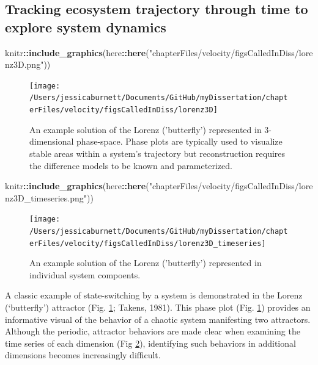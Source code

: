\documentclass[12pt,twoside,openany]{reedthesis}
\newenvironment{Shaded}{\begin{snugshade}}{\end{snugshade}}
\newcommand{\KeywordTok}[1]{\textcolor[rgb]{0.13,0.29,0.53}{\textbf{#1}}}
\newcommand{\NormalTok}[1]{#1}
\newcommand{\OperatorTok}[1]{\textcolor[rgb]{0.81,0.36,0.00}{\textbf{#1}}}
\newcommand{\StringTok}[1]{\textcolor[rgb]{0.31,0.60,0.02}{#1}}
\begin{document}
\hypertarget{tracking-ecosystem-trajectory-through-time-to-explore-system-dynamics}{%
\subsection{Tracking ecosystem trajectory through time to explore system dynamics}\label{tracking-ecosystem-trajectory-through-time-to-explore-system-dynamics}}
\begin{Shaded}
\begin{Highlighting}[]
\NormalTok{knitr}\OperatorTok{::}\KeywordTok{include_graphics}\NormalTok{(here}\OperatorTok{::}\KeywordTok{here}\NormalTok{(}\StringTok{"chapterFiles/velocity/figsCalledInDiss/lorenz3D.png"}\NormalTok{))}
\end{Highlighting}
\end{Shaded}
\begin{figure}
\texttt{[image: /Users/jessicaburnett/Documents/GitHub/myDissertation/chapterFiles/velocity/figsCalledInDiss/lorenz3D]} \caption{An example solution of the Lorenz ('butterfly') represented in 3-dimensional phase-space. Phase plots are typically used to visualize stable areas within a system's trajectory but reconstruction requires the difference models to be known and parameterized.}\label{fig:lorenz3D}
\end{figure}
\begin{Shaded}
\begin{Highlighting}[]
\NormalTok{knitr}\OperatorTok{::}\KeywordTok{include_graphics}\NormalTok{(here}\OperatorTok{::}\KeywordTok{here}\NormalTok{(}\StringTok{"chapterFiles/velocity/figsCalledInDiss/lorenz3D_timeseries.png"}\NormalTok{))}
\end{Highlighting}
\end{Shaded}
\begin{figure}
\texttt{[image: /Users/jessicaburnett/Documents/GitHub/myDissertation/chapterFiles/velocity/figsCalledInDiss/lorenz3D\_timeseries]} \caption{An example solution of the Lorenz ('butterfly') represented in individual system compoents.}\label{fig:lorenz3Dts}
\end{figure}
A classic example of state-switching by a system is demonstrated in the Lorenz (`butterfly') attractor (Fig. \ref{fig:lorenz3D}; Takens, 1981). This phase plot (Fig. \ref{fig:lorenz3D}) provides an informative visual of the behavior of a chaotic system manifesting two attractors. Although the periodic, attractor behaviors are made clear when examining the time series of each dimension (Fig \ref{fig:lorenz3Dts}), identifying such behaviors in additional dimensions becomes increasingly difficult.
\end{document}
